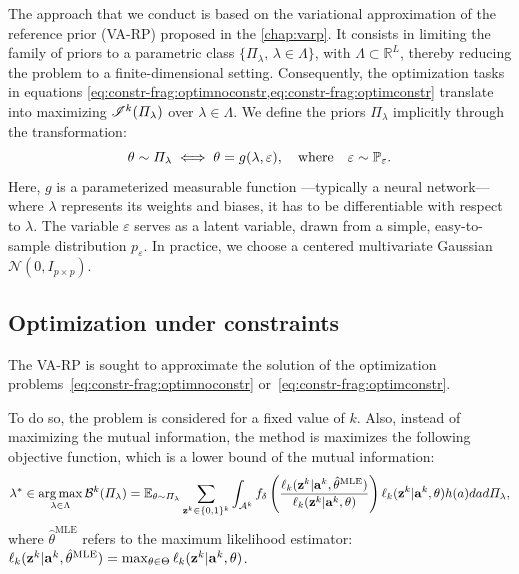 The approach that we conduct is based on the variational approximation of the reference prior (VA-RP) proposed in the \cref{chap:varp}.
It consists in limiting the family of priors to a parametric class $\{\varPi_\lambda,\,\lambda\in\Lambda\}$, with $\Lambda\subset\mathbb{R}^L$, thereby reducing the problem to a finite-dimensional setting. Consequently, the optimization tasks in equations \cref{eq:constr-frag:optimnoconstr,eq:constr-frag:optimconstr} %
translate into maximizing $\mathscr{I}^k(\varPi_\lambda)$ over $\lambda\in\Lambda$. We define the priors $\varPi_\lambda$ implicitly through the transformation:
\begin{equation}
    \theta \sim \varPi_{\lambda} \iff \theta = g(\lambda,\varepsilon), \quad \text{where} \quad \varepsilon \sim \mathbb{P}_{\varepsilon}.
\end{equation}
Here, $g$ is a parameterized measurable function ---typically a neural network--- where $\lambda$ represents its weights and biases, it has to be differentiable with respect to $\lambda$. The variable $\varepsilon$ serves as a latent variable, drawn from a simple, easy-to-sample distribution ${p}_{\varepsilon}$. In practice, we choose a centered multivariate Gaussian $\mathcal{N}(0,I_{p\times p})$.  














\subsection{Optimization under constraints}


The VA-RP is sought to approximate the solution of the optimization problems~\eqref{eq:constr-frag:optimnoconstr} or~\eqref{eq:constr-frag:optimconstr}.

To do so, the problem is considered for a fixed value of $k$. 
Also, instead of maximizing the mutual information, the method is maximizes the following objective function, which is a lower bound of the mutual information:
    \begin{equation}
        \lambda^\ast\in\operatorname*{arg\,max}_{\lambda\in\Lambda} \mathcal{B}^k(\varPi_\lambda) = \mathbb{E}_{\theta\sim\varPi_\lambda}\sum_{\mathbf{z}^k\in\{0,1\}^k}\int_{\mathcal{A}^k}f_\delta\left(\frac{\ell_k(\mathbf{z}^k|\mathbf{a}^k,\hat\theta^{\text{MLE}})}{\ell_k(\mathbf{z}^k|\mathbf{a}^k,\theta)}\right) \ell_k(\mathbf{z}^k|\mathbf{a}^k,\theta)h(a)dad\varPi_\lambda,
    \end{equation}
where $\hat\theta^{\text{MLE}}$ refers to the maximum likelihood estimator: $\ell_k(\mathbf{z}^k|\mathbf{a}^k,\hat\theta^{\text{MLE}}) = \max_{\theta\in\Theta}\ell_k(\mathbf{z}^k|\mathbf{a}^k,\theta) $.


